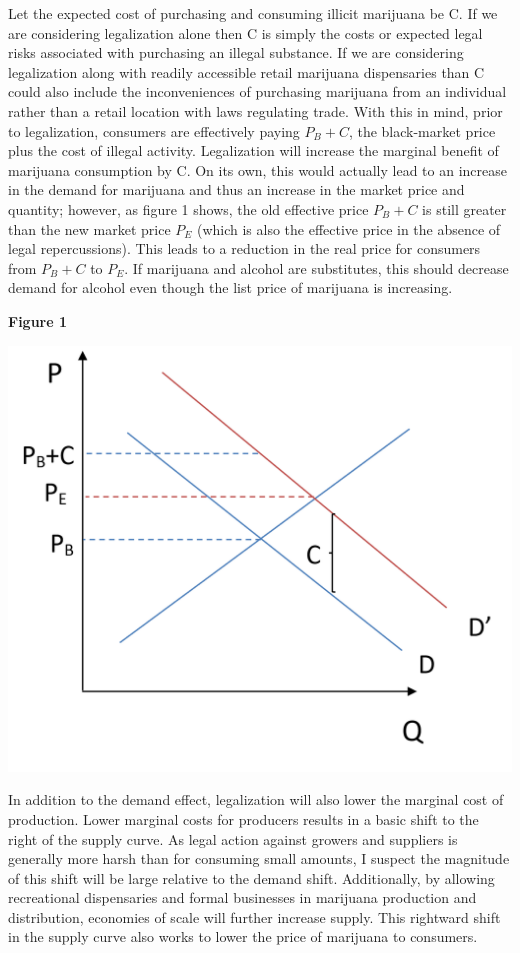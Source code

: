 \documentclass[11pt]{article}
\begin{document}
 Let the expected cost of purchasing and consuming illicit marijuana be C. If we are considering legalization alone then C is simply the costs or expected legal risks associated with purchasing an illegal substance. If we are considering legalization along with readily accessible retail marijuana dispensaries than C could also include the inconveniences of purchasing marijuana from an individual rather than a retail location with laws regulating trade. With this in mind, prior to legalization, consumers are effectively paying $P_B + C$, the black-market price plus the cost of illegal activity. Legalization will increase the marginal benefit of marijuana consumption by C. On its own, this would actually lead to an increase in the demand for marijuana and thus an increase in the market price and quantity; however, as figure 1 shows, the old effective price $ P_B + C$ is still greater than the new market price $P_E$ (which is also the effective price in the absence of legal repercussions). This leads to a reduction in the real price for consumers from $ P_B + C$ to $P_E$. If marijuana and alcohol are substitutes, this should decrease demand for alcohol even though the list price of marijuana is increasing.\par
\begin{center}
	\centering
	
	\textbf{Figure 1}\par\medskip
	
	\includegraphics[width=.5\linewidth]{legal_dside.png}
	
\end{center}


In addition to the demand effect, legalization will also lower the marginal cost of production. Lower marginal costs for producers results in a basic shift to the right of the supply curve. As legal action against growers and suppliers is generally more harsh than for consuming small amounts, I suspect the magnitude of this shift will be large relative to the demand shift. Additionally, by allowing recreational dispensaries and formal businesses in marijuana production and distribution, economies of scale will further increase supply. This rightward shift in the supply curve also works to lower the price of marijuana to consumers. \par
\end{document}
